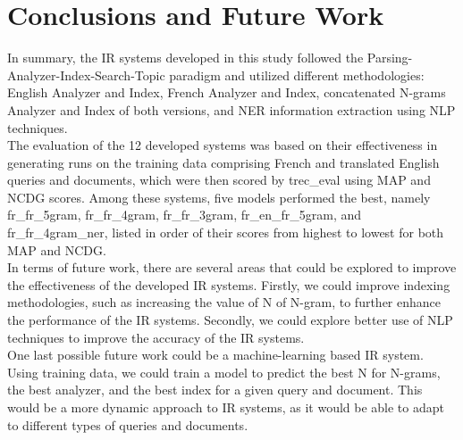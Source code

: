 \section{Conclusions and Future Work}
\label{sec:conclusion}

In summary, the IR systems developed in this study followed the Parsing-Analyzer-Index-Search-Topic paradigm and utilized different methodologies: English Analyzer and Index, French Analyzer and Index, 
concatenated N-grams Analyzer and Index of both versions, and NER information extraction using NLP techniques. \\
The evaluation of the 12 developed systems was based on their effectiveness in generating runs on the training data comprising French and translated English queries and documents, which were then scored by trec\_eval using MAP and NCDG scores. Among these systems, five models performed the best, namely fr\_fr\_5gram, fr\_fr\_4gram, fr\_fr\_3gram, fr\_en\_fr\_5gram, and fr\_fr\_4gram\_ner, listed in order of their scores from highest to lowest for both MAP and NCDG.\\
In terms of future work, there are several areas that could be explored to improve the effectiveness of the developed IR systems. Firstly, we could improve indexing methodologies, such as increasing the value of N of N-gram, to further enhance the performance of the IR systems. 
Secondly,  we could explore better use of NLP techniques to improve the accuracy of the IR systems.\\
One last possible future work could be a machine-learning based IR system. Using training data, we could train a model to predict the best N for N-grams, the best analyzer, and the best index for a given query and document. This would be a more dynamic approach to IR systems, as it would be able to adapt to different types of queries and documents.